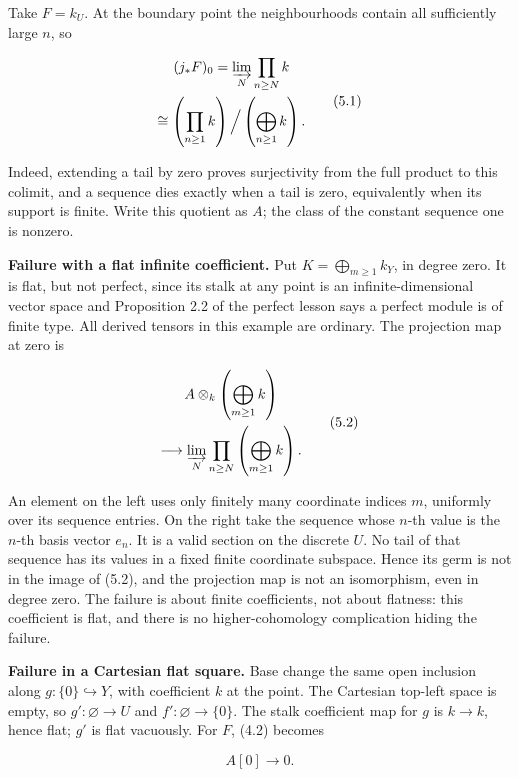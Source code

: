 \documentclass[
  english,
  11pt,
  a4paper,
]{article}
\begin{document}
Take \(F=k_U\). At the boundary point the neighbourhoods contain all
sufficiently large \(n\), so

\[\begin{gathered}
(j_*F)_0=\varinjlim_N\prod_{n\ge N}k\\
\cong\left(\prod_{n\ge1}k\right)\Big/\left(\bigoplus_{n\ge1}k\right).
\end{gathered}
\tag{5.1}\]

Indeed, extending a tail by zero proves surjectivity from the full
product to this colimit, and a sequence dies exactly when a tail is
zero, equivalently when its support is finite. Write this quotient as
\(A\); the class of the constant sequence one is nonzero.

\textbf{Failure with a flat infinite coefficient.} Put
\(K=\bigoplus_{m\ge1}k_Y\), in degree zero. It is flat, but not perfect,
since its stalk at any point is an infinite-dimensional vector space and
Proposition 2.2 of the perfect lesson says a perfect module is of finite
type. All derived tensors in this example are ordinary. The projection
map at zero is

\[\begin{gathered}
A\otimes_k\left(\bigoplus_{m\ge1}k\right)\\
\longrightarrow\varinjlim_N\prod_{n\ge N}\left(\bigoplus_{m\ge1}k\right).
\end{gathered}
\tag{5.2}\]

An element on the left uses only finitely many coordinate indices \(m\),
uniformly over its sequence entries. On the right take the sequence
whose \(n\)-th value is the \(n\)-th basis vector \(e_n\). It is a valid
section on the discrete \(U\). No tail of that sequence has its values
in a fixed finite coordinate subspace. Hence its germ is not in the
image of (5.2), and the projection map is not an isomorphism, even in
degree zero. The failure is about finite coefficients, not about
flatness: this coefficient is flat, and there is no higher-cohomology
complication hiding the failure.

\textbf{Failure in a Cartesian flat square.} Base change the same open
inclusion along \(g:\{0\}\hookrightarrow Y\), with coefficient \(k\) at
the point. The Cartesian top-left space is empty, so
\(g':\varnothing\to U\) and \(f':\varnothing\to\{0\}\). The stalk
coefficient map for \(g\) is \(k\to k\), hence flat; \(g'\) is flat
vacuously. For \(F\), (4.2) becomes

\[A[0]\longrightarrow0.
\tag{5.3}\]
\end{document}

